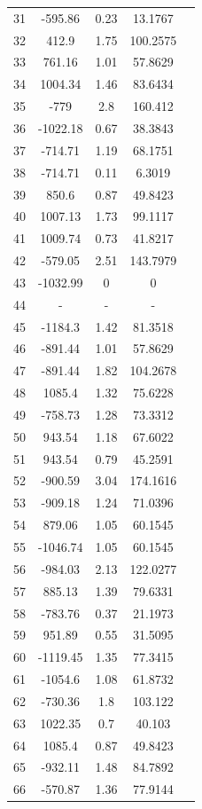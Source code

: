 {\begin{longtable}{ccccc}
31 & -595.86 & 0.23 & 13.1767 \\ 
32 & 412.9 & 1.75 & 100.2575 \\ 
33 & 761.16 & 1.01 & 57.8629 \\ 
34 & 1004.34 & 1.46 & 83.6434 \\ 
35 & -779 & 2.8 & 160.412 \\ 
36 & -1022.18 & 0.67 & 38.3843 \\ 
37 & -714.71 & 1.19 & 68.1751 \\ 
38 & -714.71 & 0.11 & 6.3019 \\ 
39 & 850.6 & 0.87 & 49.8423 \\ 
40 & 1007.13 & 1.73 & 99.1117 \\ 
41 & 1009.74 & 0.73 & 41.8217 \\ 
42 & -579.05 & 2.51 & 143.7979 \\ 
43 & -1032.99 & 0 & 0 \\ 
44 & - & - & -   \\ 
45 & -1184.3 & 1.42 & 81.3518 \\ 
46 & -891.44 & 1.01 & 57.8629 \\ 
47 & -891.44 & 1.82 & 104.2678 \\ 
48 & 1085.4 & 1.32 & 75.6228 \\ 
49 & -758.73 & 1.28 & 73.3312 \\ 
50 & 943.54 & 1.18 & 67.6022 \\ 
51 & 943.54 & 0.79 & 45.2591 \\ 
52 & -900.59 & 3.04 & 174.1616 \\ 
53 & -909.18 & 1.24 & 71.0396 \\ 
54 & 879.06 & 1.05 & 60.1545 \\ 
55 & -1046.74 & 1.05 & 60.1545 \\ 
56 & -984.03 & 2.13 & 122.0277 \\ 
57 & 885.13 & 1.39 & 79.6331 \\ 
58 & -783.76 & 0.37 & 21.1973 \\ 
59 & 951.89 & 0.55 & 31.5095 \\ 
60 & -1119.45 & 1.35 & 77.3415 \\ 
61 & -1054.6 & 1.08 & 61.8732 \\ 
62 & -730.36 & 1.8 & 103.122 \\ 
63 & 1022.35 & 0.7 & 40.103 \\ 
64 & 1085.4 & 0.87 & 49.8423 \\ 
65 & -932.11 & 1.48 & 84.7892 \\ 
66 & -570.87 & 1.36 & 77.9144 \\ 

\end{longtable}}
